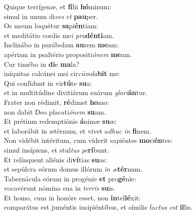 \evenverse Quique terrígenæ, et \textbf{fí}lii \textbf{hó}minum:~\*\\
\evenverse simul in unum di\textit{ves} \textit{et} \textbf{pau}per.\\
\oddverse Os meum loquétur \textbf{sa}pi\textbf{én}tiam:~\*\\
\oddverse et meditátio cordis me\textit{i} \textit{pru}\textbf{dén}\textbf{ti}am.\\
\evenverse Inclinábo in parábolam \textbf{au}rem \textbf{me}am:~\*\\
\evenverse apériam in psaltério propositi\textit{ó}\textit{nem} \textbf{me}am.\\
\oddverse Cur timébo in \textbf{di}e \textbf{ma}la?~\*\\
\oddverse iníquitas calcánei mei cir\textit{cúm}\textit{da}\textbf{bit} me:\\
\evenverse Qui confídunt in vir\textbf{tú}te \textbf{su}a:~\*\\
\evenverse et in multitúdine divitiárum suárum \textit{glo}\textit{ri}\textbf{án}tur.\\
\oddverse Frater non rédimit, \textbf{ré}dimet \textbf{ho}mo:~\*\\
\oddverse non dabit Deo placati\textit{ó}\textit{nem} \textbf{su}am.\\
\evenverse Et prétium redemptiónis \textbf{á}nimæ \textbf{su}æ:~\*\\
\evenverse et laborábit in ætérnum, et vivet a\textit{dhuc} \textit{in} \textbf{fi}nem.\\
\oddverse Non vidébit intéritum, cum víderit sapiéntes \textbf{mo}ri\textbf{én}tes:~\*\\
\oddverse simul insípiens, et stul\textit{tus} \textit{pe}\textbf{rí}bunt.\\
\evenverse Et relínquent aliénis di\textbf{ví}tias \textbf{su}as:~\*\\
\evenverse et sepúlcra eórum domus illórum \textit{in} \textit{æ}\textbf{tér}num.\\
\oddverse Tabernácula eórum in progénie \textbf{et} pro\textbf{gé}nie:~\*\\
\oddverse vocavérunt nómina sua in \textit{ter}\textit{ris} \textbf{su}is.\\
\evenverse Et homo, cum in honóre esset, non \textbf{in}tel\textbf{lé}xit:~\*\\
\evenverse comparátus est juméntis insipiéntibus, et símilis fa\textit{ctus} \textit{est} \textbf{il}lis.\\
